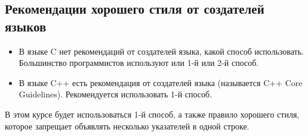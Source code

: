 \documentclass{article}
\begin{document}
\subsection*{Рекомендации хорошего стиля от создателей языков}
\begin{itemize}
\item В языке C нет рекомендаций от создателей языка, какой способ использовать.
Большинство программистов используют или 1-й или 2-й способ.
\item В языке C++ есть рекомендация от создателей языка (называется C++ Core Guidelines).
Рекомендуется использовать 1-й способ.
\end{itemize}

В этом курсе будет использоваться 1-й способ, а также правило хорошего стиля, которое запрещает объявлять несколько указателей в одной строке.
\end{document}
